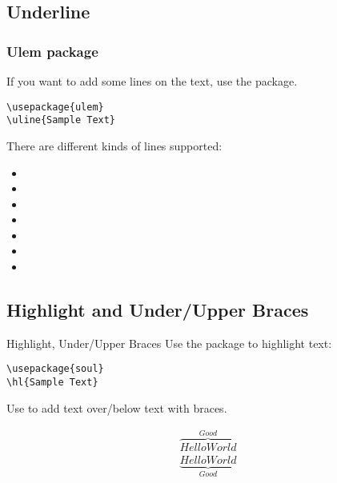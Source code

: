 \subsection{Underline}

\begin{frame}[fragile]
    \frametitle{Ulem package}
    If you want to add some lines on the text, use the  package.
    \begin{command}
        \begin{verbatim}
\usepackage{ulem}
\uline{Sample Text}
		\end{verbatim}
    \end{command}
    There are different kinds of lines supported:
    \begin{itemize}
        \item {}
        \item {}
        \item {}
        \item {}
        \item {}
        \item {}
        \item {}
    \end{itemize}
\end{frame}

\subsection{Highlight and Under/Upper Braces}

\begin{frame}[fragile]{Highlight, Under/Upper Braces}
    Use the  package to highlight text:
    \begin{command}
        \begin{verbatim}
\usepackage{soul}
\hl{Sample Text}
		\end{verbatim}
    \end{command}
    \medskip
    Use  to add text over/below text with braces.
    \begin{latexexamplesplit}
        \begin{gather*}
            \overbrace{Hello World}^{Good}\\
            \underbrace{Hello World}_{Good}
        \end{gather*}
    \end{latexexamplesplit}
\end{frame}

